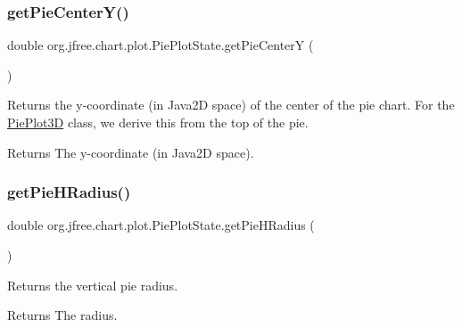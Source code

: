 \subsubsection{\texorpdfstring{get\+Pie\+Center\+Y()}{getPieCenterY()}}
{\footnotesize\ttfamily double org.\+jfree.\+chart.\+plot.\+Pie\+Plot\+State.\+get\+Pie\+CenterY (\begin{DoxyParamCaption}{ }\end{DoxyParamCaption})}

Returns the y-\/coordinate (in Java2D space) of the center of the pie chart. For the \mbox{\hyperlink{classorg_1_1jfree_1_1chart_1_1plot_1_1_pie_plot3_d}{Pie\+Plot3D}} class, we derive this from the top of the pie.

\begin{DoxyReturn}{Returns}
The y-\/coordinate (in Java2D space). 
\end{DoxyReturn}
\mbox{\label{classorg_1_1jfree_1_1chart_1_1plot_1_1_pie_plot_state_a047569663a4aaffbc2e8ea0d4b67c247}} 
\subsubsection{\texorpdfstring{get\+Pie\+H\+Radius()}{getPieHRadius()}}
{\footnotesize\ttfamily double org.\+jfree.\+chart.\+plot.\+Pie\+Plot\+State.\+get\+Pie\+H\+Radius (\begin{DoxyParamCaption}{ }\end{DoxyParamCaption})}

Returns the vertical pie radius.

\begin{DoxyReturn}{Returns}
The radius. 
\end{DoxyReturn}
\mbox{\label{classorg_1_1jfree_1_1chart_1_1plot_1_1_pie_plot_state_ac5cad70ad05db70c9fe99dfc05609ffc}} 
